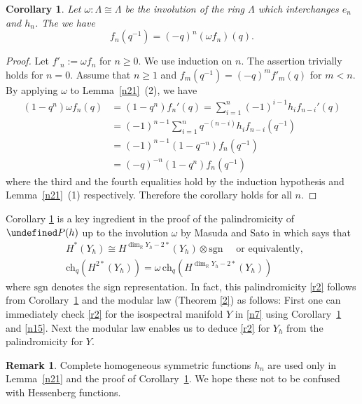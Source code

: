 \documentclass[11pt]{article}
\newtheorem{corollary}[theo]{Corollary}
\theoremstyle{definition}
\newtheorem{remark}[theo]{Remark}
\numberwithin{equation}{section}
\let\cal\undefined
\numberwithin{equation}{section}
\newcommand\RR{\mathbb{R}}
\newcommand{\cal}{\mathcal}
\newcommand\cP{{\cal P}}
\newcommand\ch{\mathrm{ch} }
\newcommand\beq{\begin{equation}}
\newcommand\eeq{\end{equation}}
\newcommand\w{\omega}
\begin{document}
\begin{corollary} \cite[Lemma~5.0.1~(2)]{MS}\label{n27}
Let $\omega:\Lambda\cong \Lambda$ be the involution of the ring $\Lambda$ which interchanges $e_n$ and $h_n$. 
The we have 
	$$f_n(q^{-1})=(-q)^n (\w f_n)(q).$$
\end{corollary}
\begin{proof}
	Let $f'_n:=\w f_n$ for $n\geq0$. We use induction on $n$. The assertion trivially holds for $n=0$. 
	Assume that $n\geq 1$ and $f_m(q^{-1})=(-q)^mf'_m(q)$ for $m<n$.
	By applying $\w$ to Lemma~\ref{n21}~(2), we have
	\[\begin{split}
		(1-q^n)\w f_n(q)&=(1-q^n)f_n'(q)=\sum_{i=1}^n(-1)^{i-1}h_if_{n-i}'(q)\\
		&=(-1)^{n-1}\sum_{i=1}^nq^{-(n-i)}h_if_{n-i}(q^{-1})\\
		&=(-1)^{n-1}(1-q^{-n})f_n(q^{-1})\\
		&=(-q)^{-n}(1-q^n)f_n(q^{-1})
	\end{split}\]
	where the third and the fourth equalities hold by the induction hypothesis and Lemma~\ref{n21}~(1) respectively. Therefore the corollary holds for all $n$.
	\end{proof}

Corollary \ref{n27} is a key ingredient in the proof of the palindromicity of $\cP(h)$ up to the involution $\w$ by Masuda and Sato in \cite{MS} which says that 
\beq\label{r2} \begin{split}
	&H^*(Y_h)\cong H^{\dim_\RR Y_h-2*}(Y_h)\otimes \mathrm{sgn} \quad \text{ or equivalently, }\\
	&\ch_q(H^{2*}(Y_h))=\w\,\ch_q(H^{\dim_\RR Y_h-2*}(Y_h))
\end{split}\eeq
where $\mathrm{sgn}$ denotes the sign representation.
In fact, this palindromicity \eqref{r2} follows from Corollary~\ref{n27} and the modular law (Theorem \ref{2}) as follows: First one can immediately check \eqref{r2} for the isospectral manifold $Y$ in \eqref{n7} using Corollary~\ref{n27} and \eqref{n15}. Next the modular law enables us to deduce \eqref{r2} for $Y_h$ from the palindromicity for $Y$.  


\begin{remark}
	Complete homogeneous symmetric functions $h_n$ are used only in Lemma~\ref{n21} and the proof of Corollary~\ref{n27}. We hope these not to be confused with Hessenberg functions.
\end{remark}
\end{document}
